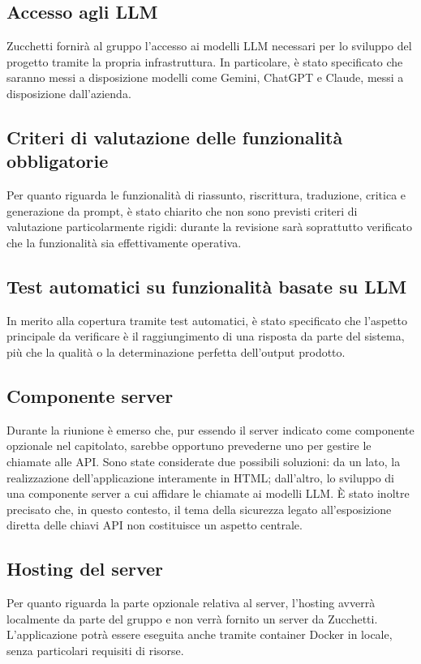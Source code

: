 \documentclass[a4paper, 10pt, colorlinks=true, linkcolor=black, urlcolor=blue, citecolor=blue, hidelinks]{article}
\begin{document}
\subsection{Accesso agli LLM}
Zucchetti fornirà al gruppo l'accesso ai modelli LLM necessari per lo sviluppo del progetto tramite la propria infrastruttura. In particolare, è stato specificato che saranno messi a disposizione modelli come Gemini, ChatGPT e Claude, messi a disposizione dall'azienda.

\subsection{Criteri di valutazione delle funzionalità obbligatorie}
Per quanto riguarda le funzionalità di riassunto, riscrittura, traduzione, critica e generazione da prompt, è stato chiarito che non sono previsti criteri di valutazione particolarmente rigidi: durante la revisione sarà soprattutto verificato che la funzionalità sia effettivamente operativa.

\subsection{Test automatici su funzionalità basate su LLM}
In merito alla copertura tramite test automatici, è stato specificato che l'aspetto principale da verificare è il raggiungimento di una risposta da parte del sistema, più che la qualità o la determinazione perfetta dell'output prodotto.

\subsection{Componente server}
Durante la riunione è emerso che, pur essendo il server indicato come componente opzionale nel capitolato, sarebbe opportuno prevederne uno per gestire le chiamate alle API. Sono state considerate due possibili soluzioni: da un lato, la realizzazione dell'applicazione interamente in HTML; dall'altro, lo sviluppo di una componente server a cui affidare le chiamate ai modelli LLM. È stato inoltre precisato che, in questo contesto, il tema della sicurezza legato all'esposizione diretta delle chiavi API non costituisce un aspetto centrale.

\subsection{Hosting del server}
Per quanto riguarda la parte opzionale relativa al server, l'hosting avverrà localmente da parte del gruppo e non verrà fornito un server da Zucchetti. L'applicazione potrà essere eseguita anche tramite container Docker in locale, senza particolari requisiti di risorse.
\end{document}
